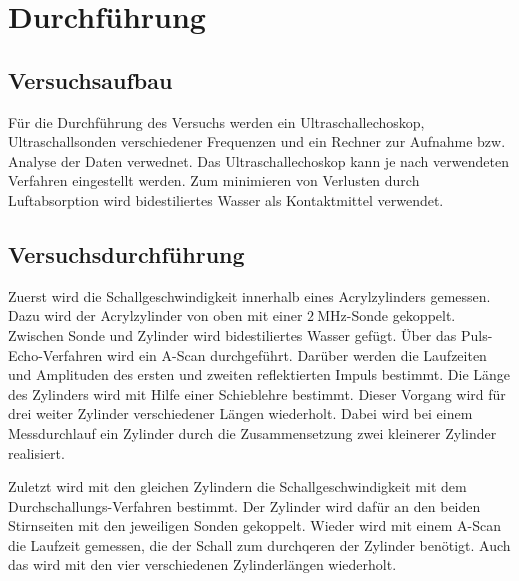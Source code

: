 \section{Durchführung}
\label{sec:Durchführung}

\subsection{Versuchsaufbau}
Für die Durchführung des Versuchs werden ein Ultraschallechoskop, Ultraschallsonden verschiedener Frequenzen und ein Rechner zur Aufnahme bzw. Analyse der Daten verwednet. Das Ultraschallechoskop kann je nach verwendeten Verfahren eingestellt werden. Zum minimieren von Verlusten durch Luftabsorption wird bidestiliertes Wasser als Kontaktmittel verwendet.

\subsection{Versuchsdurchführung}
Zuerst wird die Schallgeschwindigkeit innerhalb eines Acrylzylinders gemessen. Dazu wird der Acrylzylinder von oben mit einer $\SI{2}{\mega\hertz}$-Sonde gekoppelt. Zwischen Sonde und Zylinder wird bidestiliertes Wasser gefügt. Über das Puls-Echo-Verfahren wird ein A-Scan durchgeführt. Darüber werden die Laufzeiten und Amplituden des ersten und zweiten reflektierten Impuls bestimmt. Die Länge des Zylinders wird mit Hilfe einer Schieblehre bestimmt. Dieser Vorgang wird für drei weiter Zylinder verschiedener Längen wiederholt. Dabei wird bei einem Messdurchlauf ein Zylinder durch die Zusammensetzung zwei kleinerer Zylinder realisiert. 

Zuletzt wird mit den gleichen Zylindern die Schallgeschwindigkeit mit dem Durchschallungs-Verfahren bestimmt. Der Zylinder wird dafür an den beiden Stirnseiten mit den jeweiligen Sonden gekoppelt. Wieder wird mit einem A-Scan die Laufzeit gemessen, die der Schall zum durchqeren der Zylinder benötigt. Auch das wird mit den vier verschiedenen Zylinderlängen wiederholt.



